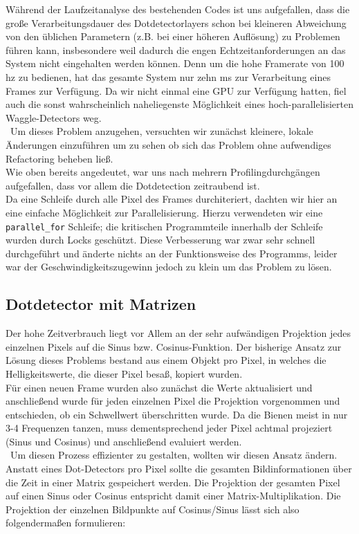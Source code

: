 \documentclass[11pt,a4paper]{article}
\begin{document}
Während der Laufzeitanalyse des bestehenden Codes ist uns aufgefallen, dass die große Verarbeitungsdauer des Dotdetectorlayers schon bei kleineren Abweichung von den üblichen Parametern (z.B. bei einer höheren Auflösung) zu Problemen führen kann, insbesondere weil dadurch die engen Echtzeitanforderungen an das System nicht eingehalten werden können. Denn um die hohe Framerate von 100 hz zu bedienen, hat das gesamte System nur zehn ms zur Verarbeitung eines Frames zur Verfügung. Da wir nicht einmal eine GPU zur Verfügung hatten, fiel auch die sonst wahrscheinlich naheliegenste Möglichkeit eines hoch-parallelisierten Waggle-Detectors weg.\\\
Um dieses Problem anzugehen, versuchten wir zunächst kleinere, lokale Änderungen einzuführen um zu sehen ob sich das Problem ohne aufwendiges Refactoring beheben ließ.\\
Wie oben bereits angedeutet, war uns nach mehrern Profilingdurchgängen aufgefallen, dass vor allem die Dotdetection zeitraubend ist.\\
Da eine Schleife durch alle Pixel des Frames durchiteriert, dachten wir hier an eine einfache Möglichkeit zur Parallelisierung.
Hierzu verwendeten wir eine {\tt parallel\_for} Schleife; die kritischen Programmteile innerhalb der Schleife wurden durch Locks geschützt.
Diese Verbesserung war zwar sehr schnell durchgeführt und änderte nichts an der Funktionsweise des Programms, leider war der Geschwindigkeitszugewinn jedoch zu klein um das Problem zu lösen.\\

\subsection{Dotdetector mit Matrizen}

Der hohe Zeitverbrauch liegt vor Allem an der sehr aufwändigen Projektion jedes einzelnen Pixels auf die Sinus bzw. Cosinus-Funktion.
Der bisherige Ansatz zur Lösung dieses Problems bestand aus einem Objekt pro Pixel, in welches die Helligkeitswerte, die dieser Pixel besaß, kopiert wurden.\\
Für einen neuen Frame wurden also zunächst die Werte aktualisiert und anschließend wurde für jeden einzelnen Pixel die Projektion vorgenommen und entschieden, ob ein Schwellwert überschritten wurde.
Da die Bienen meist in nur 3-4 Frequenzen tanzen, muss dementsprechend jeder Pixel achtmal projeziert (Sinus und Cosinus) und anschließend evaluiert werden.\\\
Um diesen Prozess effizienter zu gestalten, wollten wir diesen Ansatz ändern. Anstatt eines Dot-Detectors pro Pixel sollte die gesamten Bildinformationen über die Zeit in einer Matrix gespeichert werden.
Die Projektion der gesamten Pixel auf einen Sinus oder Cosinus entspricht damit einer Matrix-Multiplikation.
Die Projektion der einzelnen Bildpunkte auf Cosinus/Sinus lässt sich also folgendermaßen formulieren:
\end{document}
